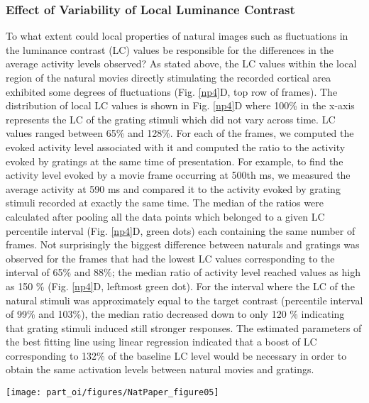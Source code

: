 \subsubsection{Effect of Variability of Local Luminance Contrast}

To what extent could local properties of natural images such as
fluctuations in the luminance contrast (LC)  values be responsible for the differences in the average activity
levels observed? As stated above, the LC values within the local region of
the natural movies directly stimulating the recorded cortical area
exhibited some degrees of fluctuations (Fig. \ref{np4}D, top row of
frames). The distribution of local LC values is shown in Fig. \ref{np4}D
where 100\% in the x-axis represents the LC of the grating stimuli which
did not vary across time. LC values ranged between 65\% and 128\%. For each
of the frames, we computed the evoked activity level associated with it and
computed the ratio to the activity evoked by gratings at the same time of
presentation. For example, to find the activity level evoked by a movie
frame occurring at 500th ms, we measured the average activity at 590 ms and
compared it to the activity evoked by grating stimuli recorded at exactly
the same time. The median of the ratios were calculated after pooling all
the data points which belonged to a given LC percentile interval (Fig.
\ref{np4}D, green dots) each containing the same number of frames. Not
surprisingly the biggest difference between naturals and gratings was
observed for the frames that had the lowest LC values corresponding to the
interval of 65\% and 88\%; the median ratio of activity level reached
values as high as 150 \% (Fig. \ref{np4}D, leftmost green dot). For the
interval where the LC of the natural stimuli was approximately equal to the
target contrast (percentile interval of 99\% and 103\%), the median ratio
decreased down to only 120 \% indicating that grating stimuli induced still
stronger responses. The estimated parameters of the best fitting line using
linear regression indicated that a boost of LC corresponding to 132\% of
the baseline LC level would be necessary in order to obtain the same
activation levels between natural movies and gratings.

\begin{SCfigure} 
\texttt{[image: part\_oi/figures/NatPaper\_figure05]} 
\caption[Transient Part of the Response to Stimulus Onset.]{ \protect}
\label{np5}\end{SCfigure} 


